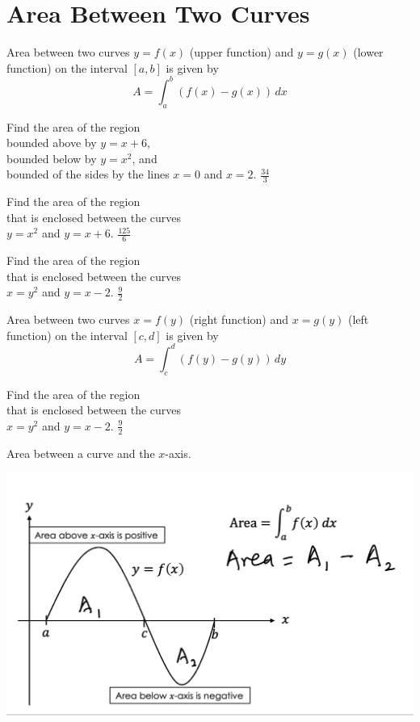 
\section{Area Between Two Curves}

\begin{myframe}[arc=10pt,auto outer arc]
Area between two curves $y=f(x)$ (upper function) and $y=g(x)$ (lower function) on the interval $[a, b]$ is given by
\[
A = \int_a^b \left(f(x) - g(x)\right) \, dx
\]
\end{myframe}

\problemans%
{Find the area of the region\\
bounded above by $y = x + 6$,\\
bounded below by $y=x^2$, and \\
bounded of the sides by the lines $x=0$ and $x=2$.}
{$\frac{34}{3}$}%

\problemans%
{Find the area of the region\\
that is enclosed between the curves\\
$y=x^2$ and $y=x+6$.}%
{$\displaystyle \frac{125}{6}$}%

\newpage

\problemans%
{Find the area of the region\\
that is enclosed between the curves\\
$x=y^2$ and $y=x-2$.
}%
{$\displaystyle \frac{9}{2}$}%

\makenewpage
\begin{myframe}[arc=10pt,auto outer arc]
Area between two curves $x=f(y)$ (right function) and $x=g(y)$ (left function) on the interval $[c, d]$ is given by
\[
A = \int_c^d \left(f(y) - g(y)\right) \, dy
\]
\end{myframe}

\problemans%
{Find the area of the region\\
that is enclosed between the curves\\
$x=y^2$ and $y=x-2$.
}%
{$\frac{9}{2}$}%


\makenewpage

\begin{myframe}[arc=10pt,auto outer arc]
	\noindent Area between a curve and the $x$-axis.
	
	\includegraphics[width=0.7\linewidth]{chapter5/area}
\end{myframe}


